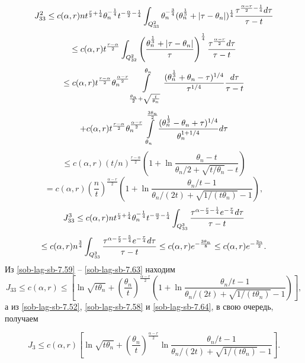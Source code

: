 $$
J_{33}^2\le c(\alpha,r)nt^{\frac{r}{2}+\frac14}\theta_n^{-\frac14}t^{-\frac{\alpha}{2}-\frac14}
\int_{Q_{33}^2}\theta_n^{-\frac34}(\theta_n^{\frac13}+|\tau-\theta_n|)^{\frac14}{\tau^{\frac{\alpha-r}{2}
-\frac14}d\tau\over  \tau-t}
$$
$$
\le c(\alpha,r)t^{\frac{r-\alpha}{2}}\int_{Q_{32}^2}\left(\theta_n^{\frac13}+|\tau-\theta_n|\over \tau\right)^{\frac14}{\tau^{\frac{\alpha-r}{2}}d\tau\over \tau-t}
$$
$$
\le c(\alpha,r)t^{\frac{r-\alpha}{2}}\theta_n^{\frac{\alpha-r}{2}}
\int\limits_{\frac{\theta_n}{2}+\sqrt{\frac{t}{\theta_n}}}^{\theta_n}{(\theta_n^{\frac13}+\theta_n-\tau)^{1/4}\over  \tau^{1/4}}{d\tau\over \tau-t}
$$
$$
+ c(\alpha,r)t^{\frac{r-\alpha}{2}}\theta_n^{\frac{\alpha-r}{2}}
\int\limits_{\theta_n}^{\frac{3\theta_n}{2}}{(\theta_n^{\frac13}-\theta_n+\tau)^{1/4}\over \theta_n^{1+1/4}}d\tau
$$
$$
\le c(\alpha,r)(t/n)^{\frac{r-\alpha}{2}}\left(1+\ln\frac{\theta_n-t}{\theta_n/2+\sqrt{t/\theta_n}-t}\right)
$$
\begin{equation}\label{sob-lag-sb-7.62}
=c(\alpha,r)\left(\frac{n}{t}\right)^\frac{\alpha-r}{2}
\left(1+\ln\frac{\theta_n/t-1}{\theta_n/(2t)+\sqrt{1/(t\theta_n)}-1}\right),
\end{equation}
$$
J_{33}^3\le c(\alpha,r)nt^{\frac{r}{2}+\frac14}\theta_n^{-\frac14}t^{-\frac{\alpha}{2}-\frac14}
\int_{Q_{33}^3}{\tau^{\alpha-\frac{r}{2}-\frac14}e^{-\frac{\tau}{4}}d\tau\over  \tau-t}
$$
\begin{equation}\label{sob-lag-sb-7.63}
\le c(\alpha,r)n^\frac34
\int_{Q_{33}^3}{\tau^{\alpha-\frac{r}{2}-\frac54}e^{-\frac{\tau}{4}}d\tau\over  \tau-t}
\le c(\alpha,r)e^{-\frac{3\theta_n}{8}}\le c(\alpha,r)e^{-\frac{3n}{2}}.
\end{equation}
Из \eqref{sob-lag-sb-7.59} -- \eqref{sob-lag-sb-7.63} находим
\begin{equation}\label{sob-lag-sb-7.64}
J_{33}\le c(\alpha,r)\le\left[\ln\sqrt{t\theta_n} +\left(\frac{\theta_n}{t}\right)^\frac{\alpha-r}{2}
\left(1+\ln\frac{\theta_n/t-1}{\theta_n/(2t)+\sqrt{1/(t\theta_n)}-1}\right)\right],
\end{equation}
 а из \eqref{sob-lag-sb-7.52}, \eqref{sob-lag-sb-7.58} и \eqref{sob-lag-sb-7.64}, в свою очередь, получаем

\begin{equation}\label{sob-lag-sb-7.65}
J_{3}\le c(\alpha,r)\left[\ln\sqrt{t\theta_n} +\left(\frac{\theta_n}{t}\right)^\frac{\alpha-r}{2}
\ln\frac{\theta_n/t-1}{\theta_n/(2t)+\sqrt{1/(t\theta_n)}-1}\right].
\end{equation}

